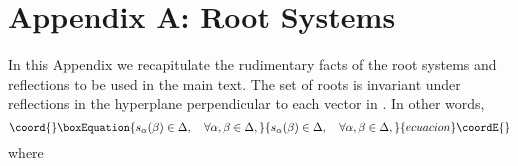 \documentclass[a4paper,12pt]{article}
\begin{document}
\section*{Appendix A: Root Systems}
\setcounter{equation}{0}

\renewcommand{\theequation}{A.\arabic{equation}}

In this Appendix we recapitulate the rudimentary facts of the root systems
and
reflections to be used in the main text.
The set of roots \myHighlight{\(\Delta\)}\coordHE{} is invariant under reflections
in the hyperplane perpendicular to each
vector in \myHighlight{\(\Delta\)}\coordHE{}.  In other words,
\begin{equation}\coord{}\boxEquation{
   s_{\alpha}(\beta)\in\Delta,\quad\forall \alpha,\beta\in\Delta,
}{
   s_{\alpha}(\beta)\in\Delta,\quad\forall \alpha,\beta\in\Delta,
}{ecuacion}\coordE{}\end{equation}
where
\end{document}
